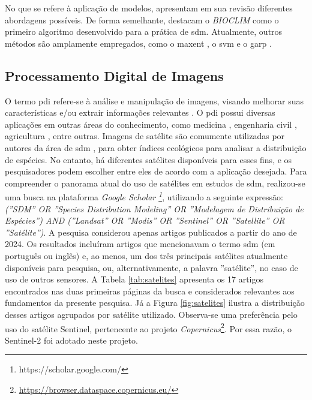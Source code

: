 No que se refere à aplicação de modelos,  apresentam em sua revisão diferentes abordagens possíveis. De forma semelhante,  destacam o \textit{BIOCLIM} como o primeiro algoritmo desenvolvido para a prática de \gls{sdm}. Atualmente, outros métodos são amplamente empregados, como o \gls{maxent} \cite{BRANCO2023110091}, o \gls{svm} \cite{miyaji_2024} e o \gls{garp} \cite{illoldi:2008}.

\subsection{Processamento Digital de Imagens}
O termo \gls{pdi} refere-se à análise e manipulação de imagens, visando melhorar suas características e/ou extrair informações relevantes \cite{costa:1998}. O \gls{pdi} possui diversas aplicações em outras áreas do conhecimento, como medicina \cite{Schiabel:2019}, engenharia civil \cite{Vital_Ferreira_2024}, agricultura \cite{silva2024identificacao}, entre outras. 
Imagens de satélite são comumente utilizadas por autores da área de \gls{sdm} \cite{beery_cole_parker_perona_winner_2021}, para obter índices ecológicos para analisar a distribuição de espécies. No entanto, há diferentes satélites disponíveis para esses fins, e os pesquisadores podem escolher entre eles de acordo com a aplicação desejada.
Para compreender o panorama atual do uso de satélites em estudos de \gls{sdm}, realizou-se uma busca na plataforma \textit{Google Scholar \footnote{https://scholar.google.com/}}, utilizando a seguinte expressão: \textit{(''SDM'' OR ''Species Distribution Modeling'' OR ''Modelagem de Distribuição de Espécies'') AND (''Landsat'' OR ''Modis'' OR ''Sentinel'' OR ''Satellite'' OR ''Satélite'')}. A pesquisa considerou apenas artigos publicados a partir do ano de 2024.
Os resultados incluíram artigos que mencionavam o termo \gls{sdm} (em português ou inglês) e, ao menos, um dos três principais satélites atualmente disponíveis para pesquisa, ou, alternativamente, a palavra ''satélite'', no caso de uso de outros sensores. A Tabela \ref{tab:satelites} apresenta os 17 artigos encontrados nas duas primeiras páginas da busca e considerados relevantes aos fundamentos da presente pesquisa. Já a Figura \ref{fig:satelites} ilustra a distribuição desses artigos agrupados por satélite utilizado.
Observa-se uma preferência pelo uso do satélite Sentinel, pertencente ao projeto \textit{Copernicus}\footnote{\url{https://browser.dataspace.copernicus.eu/}}. Por essa razão, o Sentinel-2 foi adotado neste projeto.

